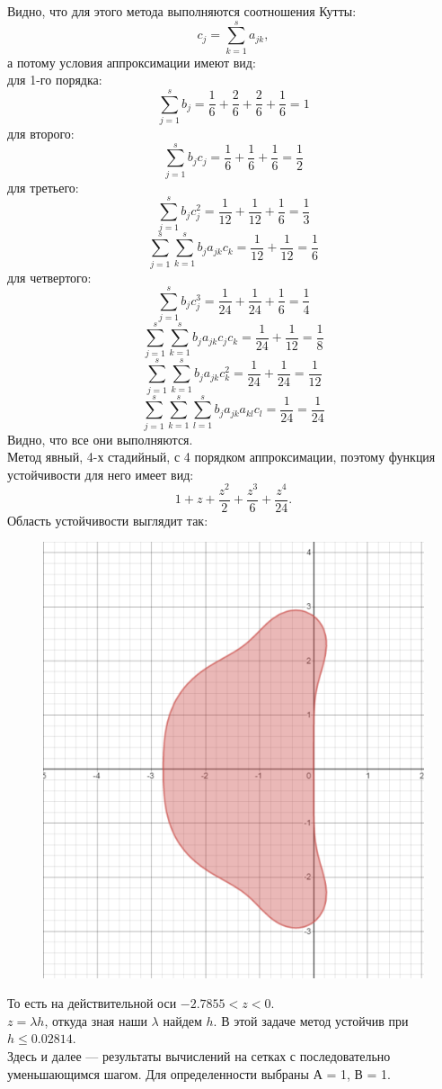 \documentclass[11pt]{article}
\begin{document}
Видно, что для этого метода выполняются соотношения Кутты:
\[
 c_j = \sum^s_{k=1} a_{jk},
\]
а потому условия аппроксимации имеют вид:\\
для 1-го порядка:
\[
 \sum^{s}_{j=1}b_j = \frac{1}{6} + \frac{2}{6} + \frac{2}{6} + \frac{1}{6} = 1
\]
для второго:
\[
 \sum^s_{j=1}b_jc_j = \frac{1}{6} + \frac{1}{6} + \frac{1}{6} = \frac{1}{2}
\]
для третьего:
\[
 \sum^s_{j=1}b_jc^2_j = \frac{1}{12} + \frac{1}{12} + \frac{1}{6} = \frac{1}{3}
\]
\[
 \sum^s_{j=1}\sum^s_{k=1} b_ja_{jk}c_k = \frac{1}{12} + \frac{1}{12} = \frac{1}{6}
\]
для четвертого:
\[
 \sum^s_{j=1}b_jc_j^3 = \frac{1}{24} + \frac{1}{24} + \frac{1}{6} = \frac{1}{4}
\]
\[
 \sum^s_{j=1}\sum^s_{k=1}b_ja_{jk}c_jc_k = \frac{1}{24} + \frac{1}{12} = \frac{1}{8}
\]
\[
 \sum^s_{j=1}\sum^s_{k=1}b_ja_{jk}c^2_k = \frac{1}{24} + \frac{1}{24} = \frac{1}{12}
\]
\[
 \sum^s_{j=1}\sum^s_{k=1}\sum^s_{l=1}b_ja_{jk}a_{kl}c_l = \frac{1}{24} = \frac{1}{24}
\]
Видно, что все они выполняются.\\
Метод явный, 4-х стадийный, с 4 порядком аппроксимации, поэтому функция устойчивости для него имеет вид:
\[
 1 + z + \frac{z^2}{2} + \frac{z^3}{6} + \frac{z^4}{24}.
\]
Область устойчивости выглядит так:
\begin{figure}[H]
\centering
\includegraphics[width=0.45\linewidth]{ust_001.png}
\end{figure}
То есть на действительной оси $-2.7855 < z < 0$. \\
$z = \lambda h$, откуда зная наши $\lambda$ найдем $h$. В этой задаче метод устойчив при $h \le 0.02814$. \\
Здесь и далее --- результаты вычислений на сетках с последовательно уменьшающимся шагом. Для определенности выбраны А = 1, В = 1.\\
\end{document}
